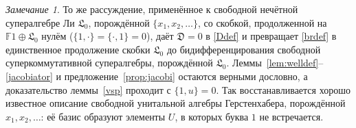 \documentclass[11pt,reqno]{amsart}
\newcommand{\F}{\mathbb F}
\newcommand{\LL}{\mathfrak L}
\newcommand{\D}{\mathfrak D}
\theoremstyle{plain}
\theoremstyle{definition}
\theoremstyle{remark}
\newtheorem{remark}[theorem]{Замечание}
\begin{document}
\begin{remark}
То же рассуждение, применённое к свободной нечётной супералгебре Ли $\LL_0$, порождённой $\{x_1,x_2,\dots\}$, со скобкой, продолженной на $\F1\oplus\LL_0$ нулём ($\{1,\cdot\}=\{\cdot,1\}=0$), даёт $\D=0$ в \eqref{Ddef} и превращает \eqref{brdef} в единственное продолжение скобки $\LL_0$ до бидифференцирования свободной суперкоммутативной супералгебры, порождённой $\LL_0$.
Леммы~\ref{lem:welldef}--\ref{jacobiator} и предложение~\ref{prop:jacobi} остаются верными дословно, а доказательство леммы~\ref{vsp} проходит с $\{1,u\}=0$.
Так восстанавливается хорошо известное описание свободной унитальной алгебры Герстенхабера, порождённой $x_1,x_2,\dots$: её базис образуют элементы $U$, в которых буква $1$ не встречается.
\end{remark}
\end{document}
